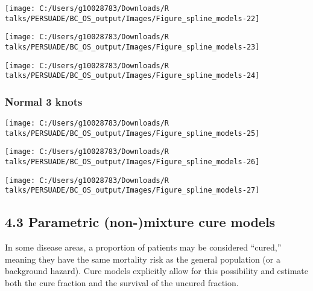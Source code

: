 \documentclass[
]{article}
\begin{document}
\begin{flushleft}\texttt{[image: C:/Users/g10028783/Downloads/R talks/PERSUADE/BC\_OS\_output/Images/Figure\_spline\_models-22]} \end{flushleft}

\begin{flushleft}\texttt{[image: C:/Users/g10028783/Downloads/R talks/PERSUADE/BC\_OS\_output/Images/Figure\_spline\_models-23]} \end{flushleft}

\begin{flushleft}\texttt{[image: C:/Users/g10028783/Downloads/R talks/PERSUADE/BC\_OS\_output/Images/Figure\_spline\_models-24]} \end{flushleft}

\clearpage

\subsubsection{Normal 3 knots}\label{normal-3-knots}

\begin{flushleft}\texttt{[image: C:/Users/g10028783/Downloads/R talks/PERSUADE/BC\_OS\_output/Images/Figure\_spline\_models-25]} \end{flushleft}

\begin{flushleft}\texttt{[image: C:/Users/g10028783/Downloads/R talks/PERSUADE/BC\_OS\_output/Images/Figure\_spline\_models-26]} \end{flushleft}

\begin{flushleft}\texttt{[image: C:/Users/g10028783/Downloads/R talks/PERSUADE/BC\_OS\_output/Images/Figure\_spline\_models-27]} \end{flushleft}

\clearpage

\subsection{4.3 Parametric (non-)mixture cure
models}\label{parametric-non-mixture-cure-models}

In some disease areas, a proportion of patients may be considered
``cured,'' meaning they have the same mortality risk as the general
population (or a background hazard). Cure models explicitly allow for
this possibility and estimate both the cure fraction and the survival of
the uncured fraction.
\end{document}
